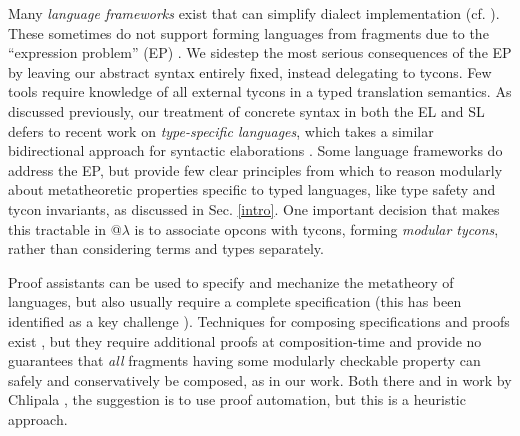 \documentclass[10pt,preprint]{sigplanconf}
\begin{document}
Many \emph{language frameworks} exist that can simplify  dialect implementation (cf. \cite{erdweg2013state}). %
These sometimes do not support forming  languages from fragments due to the ``expression problem'' (EP) \cite{wadler1998expression,Reynolds75}. We sidestep the most serious consequences of the EP by leaving our abstract syntax entirely fixed, instead  delegating to tycons. Few tools require knowledge of all external tycons in a typed translation semantics. As discussed previously, our treatment of concrete syntax in both the EL and SL defers to recent work on \emph{type-specific languages}, which takes a similar bidirectional approach for syntactic elaborations \cite{TSLs}. Some language frameworks do address the EP, but  provide few clear principles from which to reason modularly about metatheoretic properties specific to typed languages, like type safety and tycon invariants, as discussed in Sec. \ref{intro}. One important decision that makes this tractable in @$\lambda$ is to associate opcons with tycons, forming \emph{modular tycons}, rather than considering terms and types separately.

Proof assistants can be used to specify and mechanize the metatheory of languages, but also usually require a complete specification (this  has been identified as a key challenge \cite{aydemir05tphols}). Techniques for composing specifications and proofs exist \cite{conf/popl/DelawareOS13,Delaware11,conf/plpv/SchwaabS13}, but they  require additional proofs at composition-time and provide no guarantees that \emph{all} fragments having some modularly checkable property can safely and  conservatively be composed, as in our work. %
Both there and in work by Chlipala  \cite{Chlipala10}, the suggestion is to use  proof automation, but this is a heuristic approach. 
\end{document}

